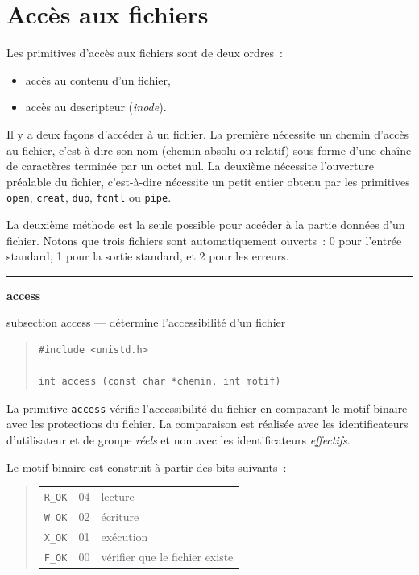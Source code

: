 \documentclass [twoside] {report}
\newcommand {\primitive} [1]
    {
	\phantomsection
	{\large \textbf {#1}}
	\addcontentsline {toc} {subsection} {#1}
    }
\newcommand {\separation}
    {
	\vspace {5mm}
	\nopagebreak
	\hrule
    }
\begin{document}
\section {Accès aux fichiers}


Les primitives d'accès aux fichiers sont de deux
ordres~:
\begin {itemize}
    \item accès au contenu d'un fichier,
    \item accès au descripteur (\textit {inode}).
\end {itemize}

Il y a deux façons d'accéder à un fichier. La première nécessite un
chemin d'accès au fichier, c'est-à-dire son nom (chemin absolu ou
relatif) sous forme d'une chaîne
de caractères terminée par un octet nul.  La deuxième nécessite
l'ouverture préalable du fichier, c'est-à-dire nécessite un petit
entier obtenu par les primitives \texttt {open}, \texttt {creat}, \texttt {dup},
\texttt {fcntl} ou \texttt {pipe}.

La deuxième méthode est la seule possible pour
accéder à la partie données d'un fichier. Notons
que trois fichiers sont automatiquement ouverts~:
0 pour l'entrée standard, 1 pour la sortie
standard, et 2 pour les erreurs.





\separation
\primitive {access} --- détermine l'accessibilité d'un fichier

\begin {quote}
\begin {verbatim}
#include <unistd.h>

int access (const char *chemin, int motif)
\end{verbatim}
\end {quote}

La primitive \texttt {access} vérifie l'accessibilité
du fichier en comparant le motif binaire avec les
protections du fichier. La comparaison est
réalisée avec les identificateurs d'utilisateur et
de groupe \textit {réels} et non avec les identificateurs
\textit {effectifs}.

Le motif binaire est construit à partir des bits
suivants~:
\begin {quote}
    \begin {tabular} {|lll|} \hline
	\verb|R_OK| & 04 & lecture \\
	\verb|W_OK| & 02 & écriture \\
	\verb|X_OK| & 01 & exécution \\
	\verb|F_OK| & 00 & vérifier que le fichier existe \\ \hline
    \end {tabular}
\end {quote}
\end{document}
